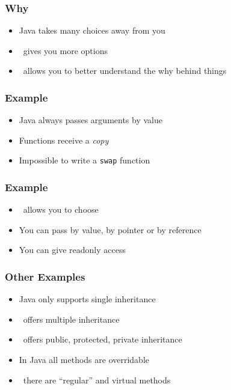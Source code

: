 \begin{frame}
  \frametitle{Why \cpp}
  \begin{itemize}
    \item Java takes many choices away from you
    \item \cpp\ gives you more options
    \item \cpp\ allows you to better understand the why behind things
  \end{itemize}
\end{frame}

\begin{frame}
  \frametitle{Example}
  \begin{itemize}
    \item Java always passes arguments by value
    \item Functions receive a \emph{copy}
    \item Impossible to write a \texttt{swap} function
  \end{itemize}
\end{frame}

\begin{frame}
  \frametitle{Example}
  \begin{itemize}
    \item \cpp\ allows you to choose
    \item You can pass by value, by pointer or by reference
    \item You can give readonly access
  \end{itemize}
\end{frame}

\begin{frame}
  \frametitle{Other Examples}
  \begin{itemize}
    \item Java only supports single inheritance
    \item \cpp\ offers multiple inheritance
    \item \cpp\ offers public, protected, private inheritance
  \end{itemize}
  \vskip5mm
  \begin{itemize}
    \item In Java all methods are overridable
    \item \cpp\ there are ``regular'' and virtual methods
  \end{itemize}
\end{frame}

